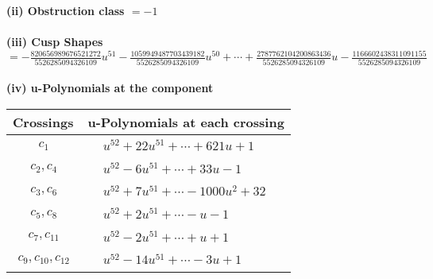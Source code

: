 \documentclass[1p]{elsarticle_modified}
\theoremstyle{definition}
\begin{document}
\flushleft \textbf{(ii) Obstruction class $= -1$}\\~\\
\flushleft \textbf{(iii) Cusp Shapes $= -\frac{820656989676521272}{5526285094326109} u^{51}-\frac{1059949487703439182}{5526285094326109} u^{50}+\cdots+\frac{2787762104200863436}{5526285094326109} u-\frac{1166602438311091155}{5526285094326109}$}\\~\\
\newpage\renewcommand{\arraystretch}{1}
\flushleft \textbf{(iv) u-Polynomials at the component}\newline \\
\begin{tabular}{m{50pt}|m{274pt}}
Crossings & \hspace{64pt}u-Polynomials at each crossing \\
\hline $$\begin{aligned}c_{1}\end{aligned}$$&$\begin{aligned}
&u^{52}+22 u^{51}+\cdots+621 u+1
\end{aligned}$\\
\hline $$\begin{aligned}c_{2},c_{4}\end{aligned}$$&$\begin{aligned}
&u^{52}-6 u^{51}+\cdots+33 u-1
\end{aligned}$\\
\hline $$\begin{aligned}c_{3},c_{6}\end{aligned}$$&$\begin{aligned}
&u^{52}+7 u^{51}+\cdots-1000 u^2+32
\end{aligned}$\\
\hline $$\begin{aligned}c_{5},c_{8}\end{aligned}$$&$\begin{aligned}
&u^{52}+2 u^{51}+\cdots- u-1
\end{aligned}$\\
\hline $$\begin{aligned}c_{7},c_{11}\end{aligned}$$&$\begin{aligned}
&u^{52}-2 u^{51}+\cdots+u+1
\end{aligned}$\\
\hline $$\begin{aligned}c_{9},c_{10},c_{12}\end{aligned}$$&$\begin{aligned}
&u^{52}-14 u^{51}+\cdots-3 u+1
\end{aligned}$\\
\hline
\end{tabular}\\~\\
\end{document}
